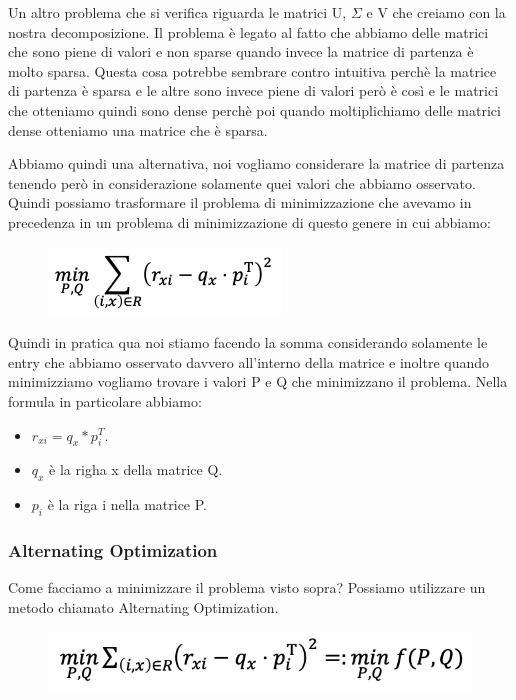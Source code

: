 \documentclass[14pt]{extreport}
\begin{document}
Un altro problema che si verifica riguarda le matrici U, $\Sigma$ e V che creiamo con la nostra decomposizione. Il problema è legato al fatto che abbiamo delle matrici
che sono piene di valori e non sparse quando invece la matrice di partenza è molto sparsa. Questa cosa potrebbe sembrare contro intuitiva perchè la matrice di partenza
è sparsa e le altre sono invece piene di valori però è così e le matrici che otteniamo quindi sono dense perchè poi quando moltiplichiamo delle matrici dense 
otteniamo una matrice che è sparsa.

Abbiamo quindi una alternativa, noi vogliamo considerare la matrice di partenza tenendo però in considerazione solamente quei valori che abbiamo osservato.
Quindi possiamo trasformare il problema di minimizzazione che avevamo in precedenza in un problema di minimizzazione di questo genere in cui abbiamo:


\begin{figure}[H] 
	\centering
	\includegraphics[width=0.7\linewidth]{515.jpeg}
	\end{figure}

Quindi in pratica qua noi stiamo facendo la somma considerando solamente le entry che abbiamo osservato davvero all'interno della matrice e inoltre 
quando minimizziamo vogliamo trovare i valori P e Q che minimizzano il problema.
Nella formula in particolare abbiamo:

\begin{itemize}
	\item $r_{xi} = q_x * p_i^T$.
	\item $q_x$ è la righa x della matrice Q.
	\item $p_i$ è la riga i nella matrice P.
\end{itemize}

\subsubsection{Alternating Optimization}

Come facciamo a minimizzare il problema visto sopra? Possiamo utilizzare un metodo chiamato Alternating Optimization.

\begin{figure}[H] 
\centering
\includegraphics[width=0.7\linewidth]{516.jpeg}
\end{figure}
\end{document}
